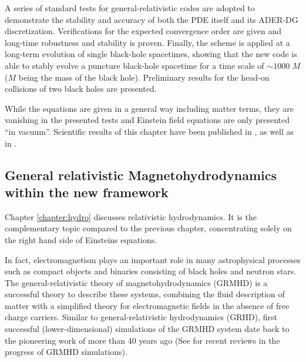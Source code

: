 \begin{fullwidth}
A series of standard tests for general-relativistic codes
\cite{Alcubierre:2003pc,Babiuc:2007vr} are adopted to demonstrate 
the stability and accuracy of both the PDE itself and its ADER-DG 
discretization.
Verifications for the expected convergence order are given and long-time
robustness and stability is proven. Finally, the scheme is applied at a
long-term evolution of single black-hole spacetimes, showing that the 
new code is able to stably evolve a puncture black-hole spacetime for a
time scale of $\sim 1000$ $M$ ($M$ being the mass of the black hole).
Preliminary results for the head-on collisions of two black holes are
presented.

While the equations are given in a general way including matter terms,
they are vanishing in the presented tests and Einstein field equations
are only presented ``in vacuum''. Scientific results of this chapter
have been published in \cite{Dumbser2017}, as 
well as in \cite{Koeppel2017,exahype-review}.

\subsection{General relativistic Magnetohydrodynamics within the
  new framework}\label{sec:hd-intro}

Chapter \vref{chapter:hydro} discusses relativistic hydrodynamics. It is 
the complementary topic compared to the previous chapter, concentrating
solely on the right hand side of Einsteins equations.

In fact, electromagnetism plays an important role in many astrophysical 
processes
such as compact objects and binaries consisting of black holes and
neutron stars. The general-relativistic theory of magnetohydrodynamics
(GRMHD) is a successful theory to describe these systems, combining the
fluid description of matter with a simplified theory for electromagnetic
fields in the absence of free charge carriers. Similar to
general-relativistic hydrodynamics (GRHD), first successful
(lower-dimensional) simulations of the GRMHD system date back to the
pioneering work of \cite{Wilson1975} more than 40 years ago
(See \cite{Font08,Marti2015} for recent reviews in the progress of GRMHD
simulations).


\end{fullwidth}
